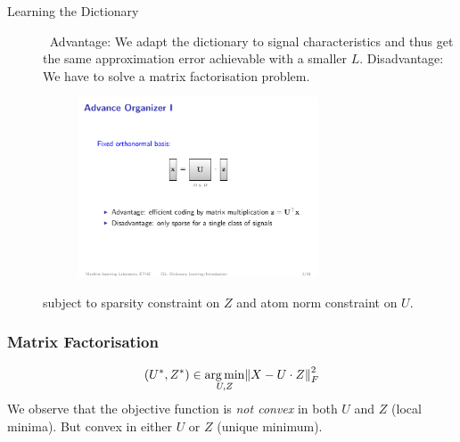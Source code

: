 \begin{description}
    \item[Learning the Dictionary] $\ $
        \subitem Advantage: We adapt the dictionary to signal characteristics and thus get the same approximation error achievable with a smaller $L$.
        \subitem Disadvantage: We have to solve a matrix factorisation problem. 
        \begin{figure}[H]
            \centering
            \includegraphics[width=0.7\textwidth,page=3]{img/10_bases}
        \end{figure}
        subject to sparsity constraint on $Z$ and atom norm constraint on $U$.
\end{description}

\subsubsection{Matrix Factorisation}
\begin{align*}
    (U^*, Z^*) \in \argmin_{U,Z} \norm{X-U\cdot Z}_F^2
\end{align*}
We observe that the objective function is \emph{not convex} in both $U$ and $Z$ (local minima). But convex in either $U$ or $Z$ (unique minimum).
